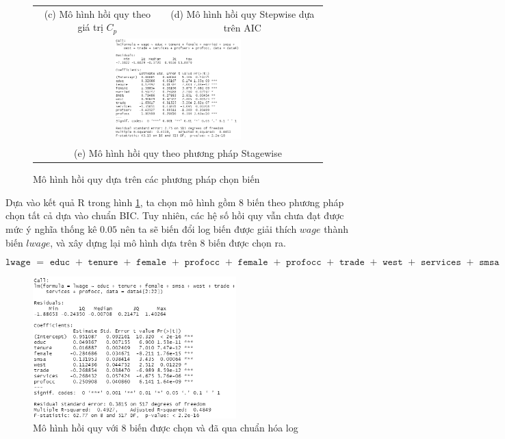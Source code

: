 \begin{figure}[H]
\begin{tabular}{cc}
		(c) Mô hình hồi quy theo giá trị $C_p$ & (d) Mô hình hồi quy Stepwise dựa trên AIC \\[6pt]
		\multicolumn{2}{c}{\includegraphics[width=0.45\textwidth]{../Photo Of Result/model-stagewise-4} }\\
		\multicolumn{2}{c}{(e) Mô hình hồi quy theo phương pháp Stagewise}
	\end{tabular}
	\caption{Mô hình hồi quy dựa trên các phương pháp chọn biến}
	\label{5-model-reg}
\end{figure}

Dựa vào kết quả R trong hình \ref{5-model-reg}, ta chọn mô hình gồm 8 biến theo phương pháp chọn tất cả dựa vào chuẩn BIC. Tuy nhiên, các hệ số hồi quy vẫn chưa đạt được mức ý nghĩa thống kê $0.05$ nên ta sẽ biến đổi log biến được giải thích $wage$ thành biến $lwage$, và xây dựng lại mô hình dựa trên 8 biến được chọn ra.

\[\texttt{lwage } = \texttt{ educ } + \texttt{ tenure } + \texttt{ female } + \texttt{ profocc } + \texttt{ female } + \texttt{ profocc } + \texttt{ trade } + \texttt{ west } + \texttt{ services } + \texttt{ smsa}\]

\begin{figure}[H]
	\centering
	\includegraphics[width=0.7\textwidth]{../Photo Of Result/model-final-4}
	\caption{Mô hình hồi quy với 8 biến được chọn và đã qua chuẩn hóa log}
	\label{model-final-4}
\end{figure}

